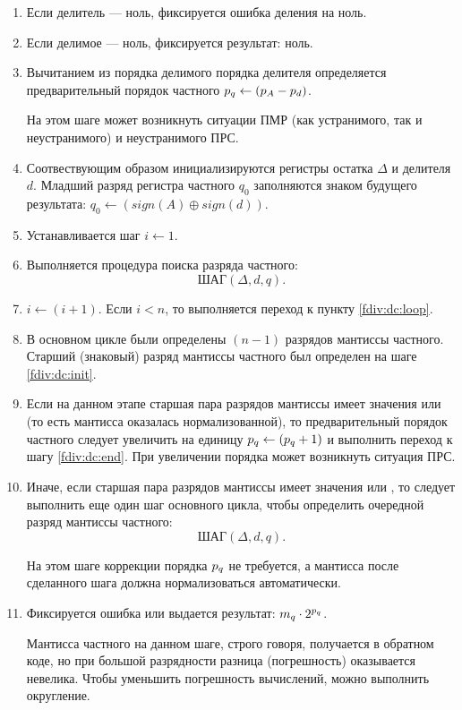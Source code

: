 \begin{enumerate}
    \item Если делитель --- ноль, фиксируется ошибка деления на ноль.
    
    \item Если делимое --- ноль, фиксируется результат: ноль.
    
    \item Вычитанием из порядка делимого порядка делителя определяется предварительный порядок частного $p_{q}\gets(p_{A}-p_{d})$.
    
    На этом шаге может возникнуть ситуации ПМР (как устранимого, так и неустранимого) и неустранимого ПРС.
    
    \item \label{fdiv:dc:init} Соотвествующим образом инициализируются регистры остатка $\Delta$ и делителя $d$. Младший разряд регистра частного $q_0$ заполняются знаком будущего результата: $q_0\gets (sign(A)\oplus sign(d))$.

    \item Устанавливается шаг $i\gets 1$.
    
    \item \label{fdiv:dc:loop} Выполняется процедура поиска разряда частного:
    \[
        \text{ШАГ}(\Delta,d,q).
    \]
    
    \item $i\gets (i + 1)$. Если $i < n$, то выполняется переход к пункту \ref{fdiv:dc:loop}.
    
    \item В основном цикле были определены $(n-1)$ разрядов мантиссы частного. Старший (знаковый) разряд мантиссы частного был определен на шаге \ref{fdiv:dc:init}.
    
    \item Если на данном этапе старшая пара разрядов мантиссы имеет значения  или  (то есть мантисса оказалась нормализованной), то предварительный порядок частного следует увеличить на единицу $p_{q}\gets(p_{q} + 1)$ и выполнить переход к шагу \ref{fdiv:dc:end}. При увеличении порядка может возникнуть ситуация ПРС.
    
    \item Иначе, если старшая пара разрядов мантиссы имеет значения  или , то следует выполнить еще один шаг основного цикла, чтобы определить очередной разряд мантиссы частного:
    \[
        \text{ШАГ}(\Delta,d,q).
    \]

    На этом шаге коррекции порядка $p_{q}$ не требуется, а мантисса после сделанного шага должна нормализоваться автоматически.
    
    \item \label{fdiv:dc:end} Фиксируется ошибка или выдается результат: $m_{q}\cdot {2}^{p_{q}}$. 
    
    Мантисса частного на данном шаге, строго говоря, получается в обратном коде, но при большой разрядности разница (погрешность) оказывается невелика. Чтобы уменьшить погрешность вычислений, можно выполнить округление.
\end{enumerate}

